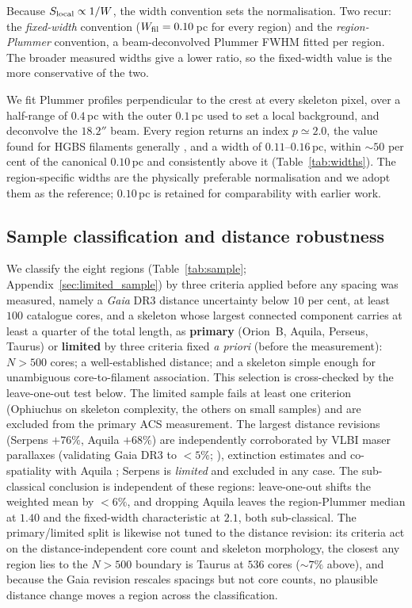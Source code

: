 \documentclass[usenatbib,twoside,twocolumn]{mnras}
\begin{document}
Because $S_{\rm local}\propto1/W$, the width convention sets the normalisation. Two recur: the \emph{fixed-width} convention ($W_{\rm fil}=0.10$\,pc for every region) and the \emph{region-Plummer} convention, a beam-deconvolved Plummer FWHM fitted per region. The broader measured widths give a lower ratio, so the fixed-width value is the more conservative of the two.

We fit Plummer profiles perpendicular to the crest at every skeleton pixel, over a half-range of $0.4$\,pc with the outer $0.1$\,pc used to set a local background, and deconvolve the $18.2''$ beam. Every region returns an index $p\simeq2.0$, the value found for HGBS filaments generally \citep{Arzoumanian2019}, and a width of $0.11$--$0.16$\,pc, within $\sim50$ per cent of the canonical $0.10$\,pc and consistently above it (Table~\ref{tab:widths}). The region-specific widths are the physically preferable normalisation and we adopt them as the reference; $0.10$\,pc is retained for comparability with earlier work.



\subsection{Sample classification and distance robustness}
\label{sec:distance_uncertainties}

We classify the eight regions (Table~\ref{tab:sample}; Appendix~\ref{sec:limited_sample}) by three criteria applied before any spacing was measured, namely a \textit{Gaia} DR3 distance uncertainty below $10$ per cent, at least $100$ catalogue cores, and a skeleton whose largest connected component carries at least a quarter of the total length, as \textbf{primary} (Orion~B, Aquila, Perseus, Taurus) or \textbf{limited} by three criteria fixed \emph{a priori} (before the measurement): $N>500$ cores; a well-established distance; and a skeleton simple enough for unambiguous core-to-filament association. This selection is cross-checked by the leave-one-out test below. The limited sample fails at least one criterion (Ophiuchus on skeleton complexity, the others on small samples) and are excluded from the primary ACS measurement. The largest distance revisions (Serpens $+76\%$, Aquila $+68\%$) are independently corroborated by VLBI maser parallaxes (validating Gaia DR3 to $<5\%$; \citealt{Kounkel2018,Xu2021,OrtizLeon2018,OrtizLeon2017}), extinction estimates \citep{Yan2022,Green2024} and co-spatiality with Aquila \citep{Zucker2020}; Serpens is \emph{limited} and excluded in any case. The sub-classical conclusion is independent of these regions: leave-one-out shifts the weighted mean by $<6\%$, and dropping Aquila leaves the region-Plummer median at $1.40$ and the fixed-width characteristic at $2.1$, both sub-classical. The primary/limited split is likewise not tuned to the distance revision: its criteria act on the distance-independent core count and skeleton morphology, the closest any region lies to the $N>500$ boundary is Taurus at $536$ cores ($\sim7\%$ above), and because the Gaia revision rescales spacings but not core counts, no plausible distance change moves a region across the classification.
\end{document}
